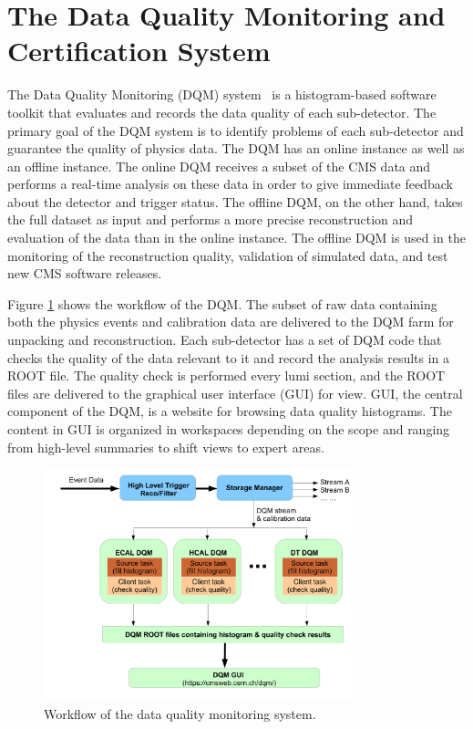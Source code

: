 \documentclass[thesis.tex]{subfiles}
\begin{document}
\section{The Data Quality Monitoring and Certification System}
The Data Quality Monitoring (DQM) system~\cite{DQMFEDE} is a histogram-based software toolkit that evaluates and records the data quality of each sub-detector.
The primary goal of the DQM system is to identify problems of each sub-detector and guarantee the quality of physics data. 
The DQM has an online instance as well as an offline instance. 
The online DQM receives a subset of the CMS data and performs a real-time analysis on these data in order to give immediate feedback about the detector and trigger status. 
The offline DQM, on the other hand, takes the full dataset as input and performs a more precise reconstruction and evaluation of the data than in the online instance.
The offline DQM is used in the monitoring of the reconstruction quality, validation of simulated data, and test new CMS software releases.

Figure \ref{fig:dqmworkflow} shows the workflow of the DQM. 
The subset of raw data containing both the physics events and calibration data are delivered to the DQM farm for unpacking and reconstruction.
Each sub-detector has a set of DQM code that checks the quality of the data relevant to it and record the analysis results in a ROOT file.
The quality check is performed every lumi section, and the ROOT files are delivered to the graphical user interface (GUI) for view.
GUI, the central component of the DQM, is a website for browsing data quality histograms.
The content in GUI is organized in workspaces depending on the scope and ranging from high-level summaries to shift views to expert areas.  

\begin{figure}[hbt]
	\centering
	\includegraphics[width=0.8\textwidth]{Fig/DQMFlow.pdf}
	\caption{Workflow of the data quality monitoring system.}
	\label{fig:dqmworkflow}
\end{figure}
\end{document}
